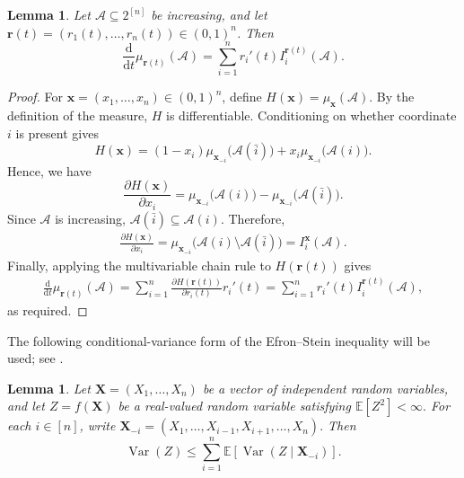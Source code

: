 \documentclass[11pt]{article}
\numberwithin{equation}{section}
\newtheorem{lemma}[theorem]{Lemma}
\theoremstyle{definition}
\theoremstyle{remark}
\begin{document}
\begin{lemma}\label{lem:margulis-russo}
Let $\mathcal{A}\subseteq2^{[n]}$ be increasing, and let
$\mathbf r(t)=(r_1(t),\ldots,r_n(t))\in(0,1)^n$. Then
\begin{equation*}
 \frac{\mathrm d}{\mathrm dt}
 \mu_{\mathbf r(t)}(\mathcal{A})
 =
 \sum_{i=1}^n
 r_i'(t)I_i^{\mathbf r(t)}(\mathcal{A}).
\end{equation*}
\end{lemma}

\begin{proof}
For $\mathbf x=(x_1,\ldots,x_n)\in(0,1)^n$, define
$
 H(\mathbf x)=\mu_{\mathbf x}(\mathcal{A}).
$
By the definition of the measure, $H$ is 
differentiable.
 Conditioning on whether coordinate $i$
is present gives
\begin{equation*}
 H(\mathbf x)
 =
 (1-x_i)
 \mu_{\mathbf x_{-i}}\bigl(\mathcal{A}(\bar{i})\bigr)
 +
 x_i
 \mu_{\mathbf x_{-i}}\bigl(\mathcal{A}(i)\bigr).
\end{equation*}
 Hence, we have
\begin{equation*}
 \frac{\partial H(\mathbf x)}{\partial x_i}
 =
 \mu_{\mathbf x_{-i}}\bigl(\mathcal{A}(i)\bigr)
 -
 \mu_{\mathbf x_{-i}}\bigl(\mathcal{A}(\bar{i})\bigr).
\end{equation*}
Since $\mathcal{A}$ is increasing,
$
 \mathcal{A}(\bar{i})\subseteq\mathcal{A}(i).
$
Therefore,
\begin{align*}
 \frac{\partial H(\mathbf x)}{\partial x_i}
=
 \mu_{\mathbf x_{-i}}
 \bigl(\mathcal{A}(i)\setminus\mathcal{A}(\bar{i})\bigr)=
 I_i^{\mathbf x}(\mathcal{A}).
\end{align*}
Finally, applying the multivariable chain rule to
$H(\mathbf r(t))$ gives
\begin{align*}
 \frac{\mathrm d}{\mathrm dt}
 \mu_{\mathbf r(t)}(\mathcal{A})
 =
 \sum_{i=1}^n
 \frac{\partial H(\mathbf r(t))}{\partial r_i(t)}r_i'(t)=
 \sum_{i=1}^n
 r_i'(t)I_i^{\mathbf r(t)}(\mathcal{A}),
\end{align*}
as required.
\end{proof}


The following conditional-variance form of the Efron--Stein inequality
will be used;  see 
\cite[Theorem~3.1]{BLM}.

\begin{lemma}\label{lem:efron-stein}
Let $\mathbf X=(X_1,\ldots,X_n)$ be a vector of independent random
variables, and let $Z=f(\mathbf X)$ be a real-valued random variable
satisfying
$
 \mathbb E[Z^2]<\infty.
$
For each $i\in[n]$, write
$
 \mathbf X_{-i}
 =
 (X_1,\ldots,X_{i-1},X_{i+1},\ldots,X_n).
$
Then
$$
 \operatorname{Var}(Z)
 \leq
 \sum_{i=1}^n
 \mathbb E\left[
  \operatorname{Var}(Z\mid\mathbf X_{-i})
 \right].
$$
\end{lemma}
\end{document}
